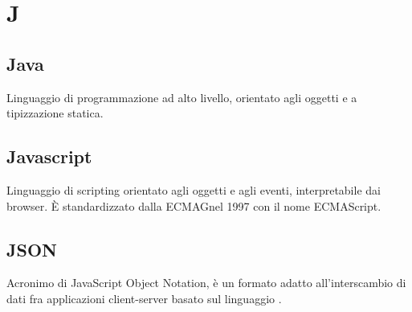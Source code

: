 \section*{J}
\markright{}

\subsection*{Java}
Linguaggio di programmazione ad alto livello, orientato agli oggetti e a tipizzazione statica.

\subsection*{Javascript}
Linguaggio di scripting orientato agli oggetti e agli eventi, interpretabile dai browser. È standardizzato dalla ECMAGnel 1997 con il nome ECMAScript.

\subsection*{JSON}
Acronimo di JavaScript Object Notation, è un formato adatto all'interscambio di dati fra applicazioni client-server basato sul linguaggio .